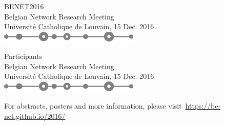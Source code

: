 \documentclass[12pt,a4paper]{article}
\begin{document}
\thispagestyle{empty}
\centering
  
{\huge BENET2016}\\[5pt]
Belgian Network Research Meeting\\[2pt]
{\large Université Catholique de Louvain, 15 Dec. 2016}\\[10pt]
\includegraphics[width=0.5\textwidth]{net-sep.pdf}\\


\vfill

\vfill

\newpage \thispagestyle{empty}

{\huge Participants}\\[5pt]
Belgian Network Research Meeting\\[2pt]
{\large Université Catholique de Louvain, 15 Dec. 2016}\\[10pt]
\includegraphics[width=0.5\textwidth]{net-sep.pdf}\\

\vfill

\makebox[\textwidth][c]{\footnotesize }
\vfill

For abstracts, posters and more information,
please visit~\href{https://be-net.github.io/2016/}{https://be-net.github.io/2016/}
\end{document}
